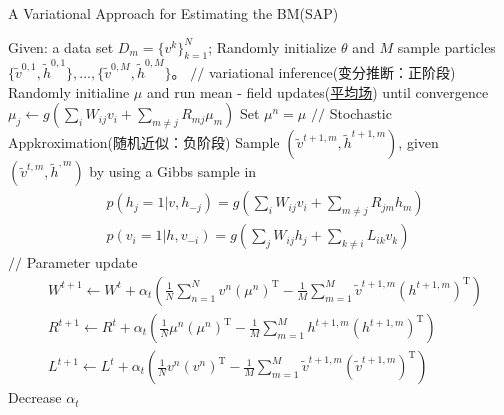              \begin{algorithm}[htbp]
                \caption{A Variational Approach for Estimating the BM(SAP)}\label{code:Variational 算法}
                \begin{algorithmic}[1]
                    \State Given: a data set $D_m = \{v^k\}_{k=1}^N$; Randomly initialize $\theta$ and $M$ sample particles $\{\tilde{ v}^{0,1},\tilde{h}^{0,1}\},\dots,\{\tilde{ v}^{0,M},\tilde{h}^{0,M}\}$。
                        \State $//$ variational inference(变分推断：正阶段)\cite{1999.Jorden.M}
                            \State Randomly initialine $\mu$ and run mean - field updates(\underline{平均场}) until convergence
                            \State $\mu_j \leftarrow g(\sum_i W_{ij}v_i + \sum_{m\neq j}R_{mj}\mu_m)$
                            \State Set $\mu^n = \mu$
                        \EndFor
                        \State $//$ Stochastic Appkroximation(随机近似：负阶段)
                            \State Sample $(\tilde{v}^{t+1,m},\tilde{h}^{t+1,m})$, given $(\tilde{v}^{t,m},\tilde{h}^{,m})$ by using a Gibbs sample in
                            \begin{align*}
                            & p(h_j=1|v,h_{-j}) = g\left(\sum_iW_{ij}v_i + \sum_{m\neq j}R_{jm}h_m\right)\\
                            & p(v_i=1|h,v_{-i}) = g\left(\sum_jW_{ij}h_j + \sum_{k\neq i}L_{ik}v_k\right)
                            \end{align*}
                        \EndFor
                        \State $//$ Parameter update
                        \begin{align*}
                        & W^{t+1} \leftarrow W^t + \alpha_t \left( \frac{1}{N}\sum_{n=1}^Nv^n (\mu^n)^\mathrm{T} - \frac{1}{M} \sum_{m=1}^M \tilde{v}^{t+1,m} (h^{t+1,m})^\mathrm{T}\right)\\
                        & R^{t+1} \leftarrow R^t + \alpha_t \left( \frac{1}{N} \mu^n(\mu^n)^\mathrm{T} - \frac{1}{M} \sum_{m=1}^M h^{t+1,m} (h^{t+1,m})^\mathrm{T} \right)\\
                        & L^{t+1} \leftarrow L^t + \alpha_t \left( \frac{1}{N} v^n(v^n)^\mathrm{T} - \frac{1}{M} \sum_{m=1}^M \tilde{v}^{t+1,m} (\tilde{v}^{t+1,m})^\mathrm{T} \right)
                        \end{align*}
                        \State Decrease $\alpha_t$
                    \EndFor
                \end{algorithmic}
            \end{algorithm}
